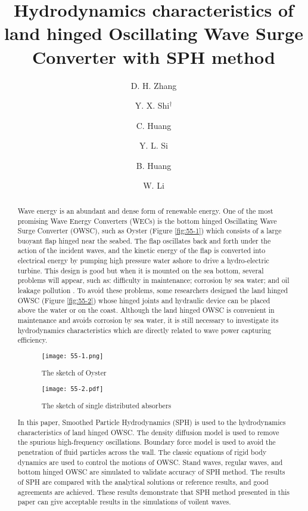 \documentclass[10pt]{article}
\title{Hydrodynamics characteristics of land hinged Oscillating Wave Surge Converter with SPH method}
\date{}
\author[$\relax$]{D. H. Zhang}
\author[$\relax$]{Y. X. Shi$^\dagger$}
\author[$\relax$]{C. Huang}
\author[$\relax$]{Y. L. Si}
\author[$\relax$]{B. Huang}
\author[$\relax$]{W. Li}
\affil[$\relax$]{Ocean College, Zhejiang University, Zhou Shan, Zhejiang province, China}
\affil[$\relax$]{\href{mailto:yingxuan_shi@163.com}{yingxuan\_shi@163.com}}
\begin{document}
\maketitle


\begin{abstract}
Wave energy is an abundant and dense form of renewable energy. One of the most promising Wave Energy Converters (WECs) is the bottom hinged Oscillating Wave Surge Converter (OWSC), such as Oyster (Figure \ref{fig:55-1}) which consists of a large buoyant flap hinged near the seabed. The flap oscillates back and forth under the action of the incident waves, and the kinetic energy of the flap is converted into electrical energy by pumping high pressure water ashore to drive a hydro-electric turbine. This design is good but when it is mounted on the sea bottom, several problems will appear, such as: difficulty in maintenance; corrosion by sea water; and oil leakage pollution \cite{do2015effects}. To avoid these problems, some researchers \cite{hansen2013discrete,zurkinden2014non} designed the land hinged OWSC (Figure \ref{fig:55-2}) whose hinged joints and hydraulic device can be placed above the water or on the coast. Although the land hinged OWSC is convenient in maintenance and avoids corrosion by sea water, it is still necessary to investigate its hydrodynamics characteristics which are directly related to wave power capturing efficiency. 
\begin{figure}[!htb]
\centering
\texttt{[image: 55-1.png]}
\caption{The sketch of Oyster}\label{fig:55-1}
\end{figure}
\begin{figure}[!htb]
\centering
\texttt{[image: 55-2.pdf]}
\caption{The sketch of single distributed absorbers}\label{fig:55-2}
\end{figure}

In this paper, Smoothed Particle Hydrodynamics (SPH) \cite{liu2010smoothed,monaghan2005smoothed} is used to the hydrodynamics characteristics of land hinged OWSC. The density diffusion model \cite{marrone2011delta} is used to remove the spurious high-frequency oscillations. Boundary force model \cite{hansen2013discrete} is used to avoid the penetration of fluid particles across the wall. The classic equations of rigid body dynamics are used to control the motions of OWSC. Stand waves, regular waves, and bottom hinged OWSC are simulated to validate accuracy of SPH method. The results of SPH are compared with the analytical solutions or reference results, and good agreements are achieved. These results demonstrate that SPH method presented in this paper can give acceptable results in the simulations of voilent waves.


\end{abstract}
\end{document}

